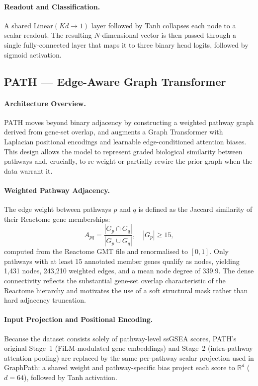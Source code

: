 \paragraph{Readout and Classification.}
A shared $\text{Linear}(Kd \to 1)$ layer followed by Tanh collapses each node to a scalar readout. The resulting $N$-dimensional vector is then passed through a single fully-connected layer that maps it to three binary head logits, followed by sigmoid activation.

\subsection{PATH --- Edge-Aware Graph Transformer}

\paragraph{Architecture Overview.}
PATH moves beyond binary adjacency by constructing a weighted pathway graph derived from gene-set overlap, and augments a Graph Transformer with Laplacian positional encodings and learnable edge-conditioned attention biases. This design allows the model to represent graded biological similarity between pathways and, crucially, to re-weight or partially rewire the prior graph when the data warrant it.

\paragraph{Weighted Pathway Adjacency.}
The edge weight between pathways $p$ and $q$ is defined as the Jaccard similarity of their Reactome gene memberships:
\begin{equation}
A_{pq} = \frac{|G_p \cap G_q|}{|G_p \cup G_q|}, \quad |G_p| \geq 15,
\end{equation}
computed from the Reactome GMT file and renormalised to $[0,1]$. Only pathways with at least 15 annotated member genes qualify as nodes, yielding 1,431 nodes, 243,210 weighted edges, and a mean node degree of 339.9. The dense connectivity reflects the substantial gene-set overlap characteristic of the Reactome hierarchy and motivates the use of a soft structural mask rather than hard adjacency truncation.

\paragraph{Input Projection and Positional Encoding.}
Because the dataset consists solely of pathway-level ssGSEA scores, PATH's original Stage~1 (FiLM-modulated gene embeddings) and Stage~2 (intra-pathway attention pooling) are replaced by the same per-pathway scalar projection used in GraphPath: a shared weight and pathway-specific bias project each score to $\mathbb{R}^d$ ($d = 64$), followed by Tanh activation.

